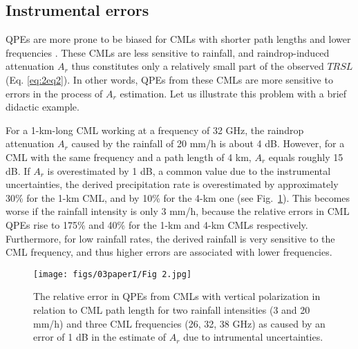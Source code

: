 \documentclass{ctuthesis}\usepackage[]{graphicx}\usepackage[]{color}
\begin{document}
\subsection{Instrumental errors} \label{InstErr}

QPEs are more prone to be biased for CMLs with shorter path lengths and lower frequencies \citep{leijnseMicrowaveLinkRainfall2008}. These CMLs are less sensitive to rainfall, and raindrop-induced attenuation $A_r$ thus constitutes only a relatively small part of the observed $T\!R\!S\!L$ (Eq. \ref{eq:2eq2}). In other words, QPEs from these CMLs are more sensitive to errors in the process of $A_r$ estimation. Let us illustrate this problem with a brief didactic example. 

For a 1-km-long CML working at a frequency of 32 GHz, the raindrop attenuation $A_r$ caused by the rainfall of 20 mm/h is about 4 dB. However, for a CML with the same frequency and a path length of 4 km, $A_r$ equals roughly 15 dB. If $A_r$ is overestimated by 1 dB, a common value due to the instrumental uncertainties, the derived precipitation rate is overestimated by approximately 30\% for the 1-km CML, and by 10\% for the 4-km one (see Fig.~\ref{2The1}). This becomes worse if the rainfall intensity is only 3 mm/h, because the relative errors in CML QPEs rise to 175\% and 40\% for the 1-km and 4-km CMLs respectively. Furthermore, for low rainfall rates, the derived rainfall is very sensitive to the CML frequency, and thus higher errors are associated with lower frequencies.

\begin{figure}[h]
\begin{center}
\texttt{[image: figs/03paperI/Fig 2.jpg]}
\caption{The relative error in QPEs from CMLs with vertical polarization in relation to CML path length for two rainfall intensities (3 and 20 mm/h) and three CML frequencies (26, 32, 38 GHz) as caused by an error of 1 dB in the estimate of $A_r$ due to intrumental uncertainties.} \label{2The1}
\end{center}
\end{figure}
\end{document}
